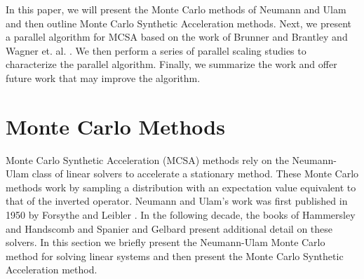 \documentclass{snamc2013}
\begin{document}
In this paper, we will present the Monte Carlo methods of Neumann and
Ulam and then outline Monte Carlo Synthetic Acceleration
methods. Next, we present a parallel algorithm for MCSA based on the
work of Brunner and Brantley \cite{brunner_efficient_2009} and Wagner
et. al. \cite{wagner_hybrid_2010}. We then perform a series of
parallel scaling studies to characterize the parallel
algorithm. Finally, we summarize the work and offer future work that
may improve the algorithm.

\section{Monte Carlo Methods}
Monte Carlo Synthetic Acceleration (MCSA) methods rely on the
Neumann-Ulam class of linear solvers to accelerate a stationary
method. These Monte Carlo methods work by sampling a distribution with
an expectation value equivalent to that of the inverted
operator. Neumann and Ulam's work was first published in 1950 by
Forsythe and Leibler \cite{forsythe_matrix_1950}. In the following
decade, the books of Hammersley and Handscomb
\cite{hammersley_monte_1964} and Spanier and Gelbard
\cite{spanier_monte_1969} present additional detail on these solvers.
In this section we briefly present the Neumann-Ulam Monte Carlo method
for solving linear systems and then present the Monte Carlo Synthetic
Acceleration method.
\end{document}
